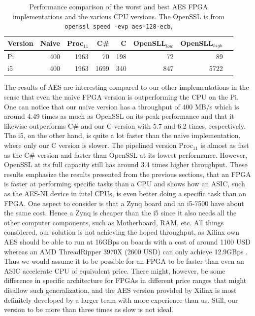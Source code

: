 \documentclass[a4paper, openany]{book}
\begin{document}
\begin{table}[H]
\centering
\captionsetup{width=.8\linewidth}
\begin{tabular}{l r r r r r r r}
\hline
\textbf{Version} & Naive & Proc$_{11}$ & C\# & C & OpenSLL$_{low}$ & OpenSLL$_{high}$\\
\hline
Pi & 400 & 1963 &    70& 198 & 72  & 89\\
i5 & 400 & 1963 & 1699 & 340 & 847 & 5722
\end{tabular}
\caption[AES: FPGA and CPU comparisons]%
{Performance comparison of the worst and best AES FPGA implementations and the various CPU versions. The OpenSSL is from \texttt{openssl speed -evp aes-128-ecb}, }
\label{tab:AEScompare}
\end{table}
The results of AES are interesting compared to our other implementations in the sense that even the naive FPGA version is outperforming the CPU on the Pi. One can notice that our naive version has a throughput of 400 MB/s which is around 4.49 times as much as OpenSSL on its peak performance and that it likewise outperforms C\# and our C-version with 5.7 and 6.2 times, respectively. The i5, on the other hand, is quite a lot faster than the naive implementation, where only our C version is slower. The pipelined version Proc\(_{11}\) is almost as fast as the C\# version and faster than OpenSSL at its lowest performance. However, OpenSSL at its full capacity still has around 3.4 times higher throughput. These results emphasize the results presented from the previous sections, that an FPGA is faster at performing specific tasks than a CPU and shows how an ASIC, such as the AES-NI device in intel CPUs, is even better doing a specific task than an FPGA. One aspect to consider is that a Zynq board and an i5-7500 have about the same cost\cite{pynq}\cite{i5price}. Hence a Zynq is cheaper than the i5 since it also needs all the other computer components, such as Motherboard, RAM, etc. All things considered, our solution is not achieving the hoped throughput, as Xilinx own AES\cite{aesxilinx} should be able to run at 16GBps on boards with a cost of around 1100 USD\cite{highfpgaprice} whereas an AMD ThreadRipper 3970X (2600 USD\cite{threadPrice}) can only achieve 12.9GBps \cite{threadripper}. Thus we would assume it to be possible for an FPGA to be faster than even an ASIC accelerate CPU of equivalent price. There might, however, be some difference in specific architecture for FPGAs in different price ranges that might disallow such generalization, and the AES version provided by Xilinx is most definitely developed by a larger team with more experience than us. Still, our version to be more than three times as slow is not ideal.
\end{document}
